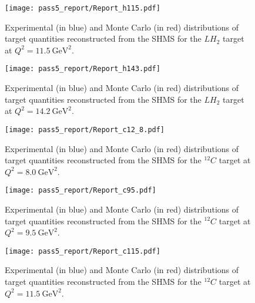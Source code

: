 \begin{figure}[!h]
    \centering
    \texttt{[image: pass5\_report/Report\_h115.pdf]}
    \caption{
            Experimental (in blue) and Monte Carlo (in red) distributions of
            target quantities reconstructed from the SHMS for
            the $LH_2$ target at $Q^2=\SI{11.5}{\giga\electronvolt\squared}$.
            }
    \label{fig:Report_h115.pdf}
\end{figure}


\begin{figure}[!h]
    \centering
    \texttt{[image: pass5\_report/Report\_h143.pdf]}
    \caption{
            Experimental (in blue) and Monte Carlo (in red) distributions of
            target quantities reconstructed from the SHMS for
            the $LH_2$ target at $Q^2=\SI{14.2}{\giga\electronvolt\squared}$.
            }
    \label{fig:Report_h143.pdf}
\end{figure}


\begin{figure}[!h]
    \centering
    \texttt{[image: pass5\_report/Report\_c12\_8.pdf]}
    \caption{
            Experimental (in blue) and Monte Carlo (in red) distributions of
            target quantities reconstructed from the SHMS for
            the ${}^{12}C$ target at $Q^2=\SI{8.0}{\giga\electronvolt\squared}$.
            }
    \label{fig:Report_c12_8.pdf}
\end{figure}


\begin{figure}[!h]
    \centering
    \texttt{[image: pass5\_report/Report\_c95.pdf]}
    \caption{
            Experimental (in blue) and Monte Carlo (in red) distributions of
            target quantities reconstructed from the SHMS for
            the ${}^{12}C$ target at $Q^2=\SI{9.5}{\giga\electronvolt\squared}$.
            }
    \label{fig:Report_c95.pdf}
\end{figure}


\begin{figure}[!h]
    \centering
    \texttt{[image: pass5\_report/Report\_c115.pdf]}
    \caption{
            Experimental (in blue) and Monte Carlo (in red) distributions of
            target quantities reconstructed from the SHMS for
            the ${}^{12}C$ target at $Q^2=\SI{11.5}{\giga\electronvolt\squared}$.
            }
    \label{fig:Report_c115.pdf}
\end{figure}


